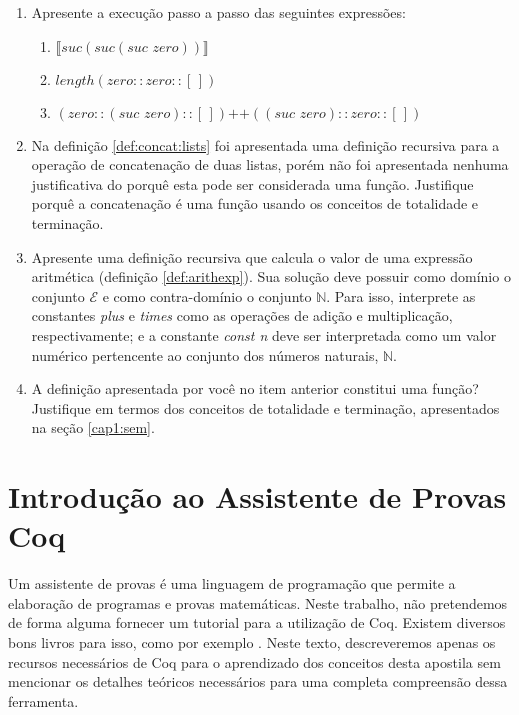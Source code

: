 \begin{enumerate}
  \item Apresente a execu\c{c}\~ao passo a passo das seguintes express\~oes:
  \begin{enumerate}
    \item $\llbracket suc (suc (suc\,\,zero))\rrbracket$ 
    \item $length (zero :: zero :: [\,])$
    \item $(zero :: (suc\,\, zero) ::[\,])\text{++}((suc\,\,zero) :: zero :: [\,])$
  \end{enumerate}
  \item Na defini\c{c}\~ao \ref{def:concat:lists} foi apresentada uma defini\c{c}\~ao recursiva para a opera\c{c}\~ao de concatena\c{c}\~ao de
        duas listas, por\'em n\~ao foi apresentada nenhuma justificativa do porqu\^e esta pode ser considerada uma fun\c{c}\~ao. Justifique
        porqu\^e a concatena\c{c}\~ao \'e uma fun\c{c}\~ao usando os conceitos de totalidade e termina\c{c}\~ao.
  \item Apresente uma defini\c{c}\~ao recursiva que calcula o valor de uma express\~ao aritm\'etica (defini\c{c}\~ao \ref{def:arithexp}).
        Sua solu\c{c}\~ao deve possuir como dom\'inio o conjunto $\mathcal{E}$ e como contra-dom\'inio o conjunto $\mathbb{N}$. Para isso, 
        interprete as constantes \textit{plus} e \textit{times} como as opera\c{c}\~oes de adi\c{c}\~ao e multiplica\c{c}\~ao, respectivamente; e
        a constante \textit{const n} deve ser interpretada como um valor num\'erico pertencente ao conjunto dos n\'umeros naturais, $\mathbb{N}$.
  \item A defini\c{c}\~ao apresentada por voc\^e no item anterior constitui uma fun\c{c}\~ao? Justifique em termos dos conceitos de totalidade
        e termina\c{c}\~ao, apresentados na se\c{c}\~ao \ref{cap1:sem}.
\end{enumerate}

\section{Introdu\c{c}\~ao ao Assistente de Provas Coq}\label{cap1:coq}

Um assistente de provas \'e uma linguagem de programa\c{c}\~ao que permite a elabora\c{c}\~ao de programas e provas matem\'aticas.
Neste trabalho, n\~ao pretendemos de forma alguma fornecer um tutorial para a utiliza\c{c}\~ao de Coq. Existem diversos bons livros
para isso, como por exemplo \cite{coqart,Pierce12,Coqrefman}. Neste texto, descreveremos apenas os recursos necess\'arios de Coq para
o aprendizado dos conceitos desta apostila sem mencionar os detalhes te\'oricos necess\'arios para uma completa compreens\~ao dessa ferramenta.

